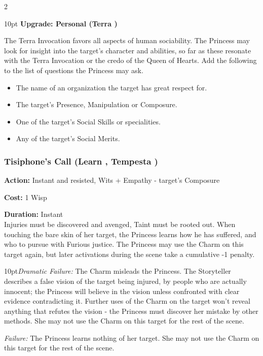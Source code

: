 \begin{multicols}{2}
\begin{myindentpar}{10pt}
\textbf{Upgrade: Personal (Terra \textbullet\textbullet)}

The Terra Invocation favors all aspects of human sociability. The Princess may look for insight into the target's character and abilities, so far as these resonate with the Terra Invocation or the credo of the Queen of Hearts. Add the following to the list of questions the Princess may ask.
\begin{itemize}
\item The name of an organization the target has great respect for. 
\item The target's Presence, Manipulation or Composure.
\item One of the target's Social Skills or specialities.
\item Any of the target's Social Merits.\end{itemize}\end{myindentpar}

\subsubsection*{Tisiphone's Call (Learn \textbullet\textbullet, Tempesta \textbullet)}

\noindent \textbf{Action:} Instant and resisted, Wits + Empathy - target's Composure

\noindent \textbf{Cost:} 1 Wisp

\noindent \textbf{Duration:} Instant\\

Injuries must be discovered and avenged, Taint must be rooted out. When touching the bare skin of her target, the Princess learns how he has suffered, and who to pursue with Furious justice. The Princess may use the Charm on this target again, but later activations during the scene take a cumulative -1 penalty.

\begin{myindentpar}{10pt}\emph{Dramatic Failure:} The Charm misleads the Princess. The Storyteller describes a false vision of the target being injured, by people who are actually innocent; the Princess will believe in the vision unless confronted with clear evidence contradicting it. Further uses of the Charm on the target won't reveal anything that refutes the vision - the Princess must discover her mistake by other methods. She may not use the Charm on this target for the rest of the scene.

\emph{Failure:} The Princess learns nothing of her target. She may not use the Charm on this target for the rest of the scene.


\end{myindentpar}
\end{multicols}
